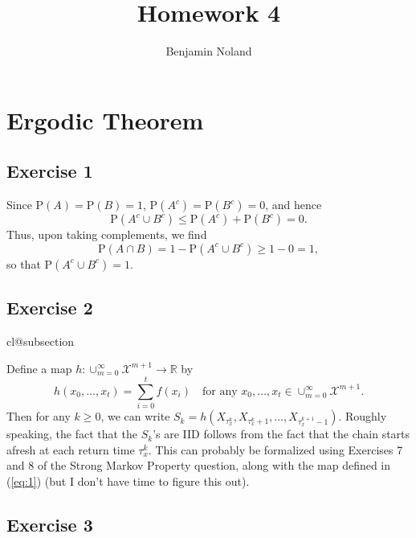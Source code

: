 \documentclass[12pt]{article}
\title{Homework 4}
\author{Benjamin Noland}
\date{}
\makeatletter
\def\nullstepcounter#1{%
	\begingroup
		\let\@elt\@stpelt
		\csname cl@#1\endcsname
	\endgroup}
\newcommand{\Prob}{\mathrm{P}}
\makeatother
\begin{document}
\maketitle

\section*{Ergodic Theorem}

\subsection*{Exercise 1}

Since $\Prob(A) = \Prob(B) = 1$, $\Prob(A^c) = \Prob(B^c) = 0$, and hence
\begin{equation*}
\Prob(A^c \cup B^c) \leq \Prob(A^c) + \Prob(B^c) = 0.
\end{equation*}
Thus, upon taking complements, we find
\begin{equation*}
\Prob(A \cap B) = 1 - \Prob(A^c \cup B^c) \geq 1 - 0 = 1,
\end{equation*}
so that $\Prob(A^c \cup B^c) = 1$.

\subsection*{Exercise 2}
\nullstepcounter{subsection}

Define a map $h : \cup_{m=0}^\infty \mathcal{X}^{m+1} \to \mathbb{R}$ by
\begin{equation} \label{eq:1}
h(x_0, \ldots, x_t) = \sum_{i=0}^t f(x_i) \quad \text{for any $x_0, \ldots, x_t \in \cup_{m=0}^\infty \mathcal{X}^{m+1}$}.
\end{equation}
Then for any $k \geq 0$, we can write $S_k = h(X_{\tau_x^k}, X_{\tau_x^k+1}, \ldots, X_{\tau_x^{k+1}-1})$. Roughly speaking, the fact that the $S_k$'s are IID follows from the fact that the chain starts afresh at each return time $\tau_x^k$. This can probably be formalized using Exercises 7 and 8 of the Strong Markov Property question, along with the map defined in (\ref{eq:1}) (but I don't have time to figure this out).

\subsection*{Exercise 3}
\end{document}
